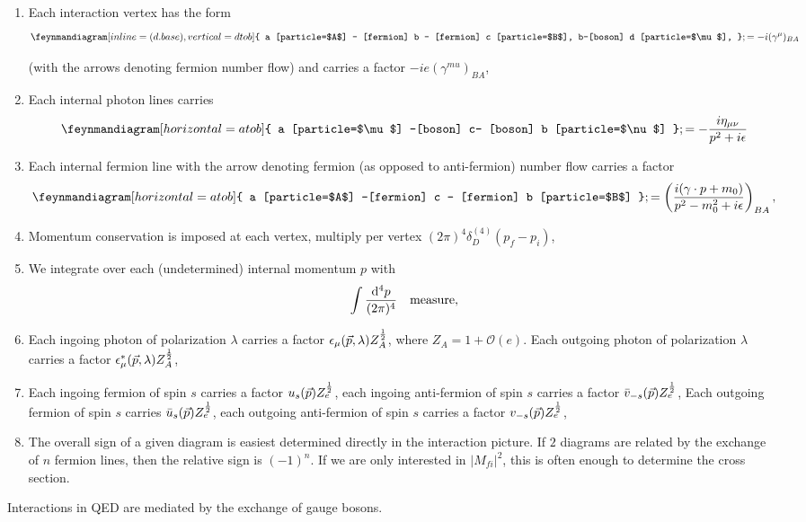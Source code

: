 	\begin{enumerate}
		\item Each interaction vertex has the form 
		\begin{equation}
		\feynmandiagram[inline=(d.base), vertical=d to b] {
		a [particle=$A$] -- [fermion] b -- [fermion] c [particle=$B$],
		b--[boson] d [particle=$\mu$],	
}; = -i (\gamma^{\mu})_{BA}
		\end{equation}

		 (with the arrows denoting fermion number flow) and carries a factor $-i e (\gamma^{mu})_{BA}$,
		 \item Each internal photon lines carries
		 \begin{equation}
		 	\feynmandiagram[ horizontal=a to b]{
		 	a [particle=$\mu$] --[boson] c-- [boson] b [particle=$\nu$]
	 	};
 	= -\frac{i \eta_{\mu \nu} }{p^2 + i \epsilon}
		 \end{equation}
		\item Each internal fermion line with the arrow denoting fermion (as opposed to anti-fermion) number flow carries a factor 
		\begin{equation}
			\feynmandiagram[horizontal=a to b]{
			a [particle=$A$] --[fermion] c -- [fermion] b [particle=$B$]
		};
	= \left(\frac{i(\gamma \cdot p + m_0)}{p^2-m^2_0 +i \epsilon }\right)_{BA},
		\end{equation}
		\item Momentum conservation is imposed at each vertex, multiply per vertex $(2 \pi)^4 \delta^{(4)}_D(p_f-p_i)$,
		\item We integrate over each (undetermined) internal momentum $p$ with
		\begin{equation}
			\int \frac{\mathrm{d}^4 p}{(2 \pi)^4} \quad \mathrm{measure},
		\end{equation}
		\item Each ingoing photon of polarization $\lambda$ carries a factor $\epsilon_{\mu} (\vec{p},\lambda) Z^{\frac{1}{2}}_A$, where $Z_A =1+\mathcal{O}(e)$. Each outgoing photon of polarization $\lambda$ carries a factor $\epsilon^*_{\mu} (\vec{p},\lambda) Z^{\frac{1}{2}}_A$,
		\item Each ingoing fermion of spin $s$ carries a factor $u_s(\vec{p}) Z^{\frac{1}{2}}_e$, each  ingoing anti-fermion of spin $s$ carries a factor $\bar{v}_{-s}(\vec{p})Z^{\frac{1}{2}}_e$, Each outgoing fermion of spin $s$ carries $\bar{u}_s(\vec{p}) Z^{\frac{1}{2}}_e$, each outgoing anti-fermion of spin $s$ carries a factor $v_{-s}(\vec{p})Z^{\frac{1}{2}}_e$,
		\item The overall sign of a given diagram is easiest determined directly in the interaction picture. If $2$ diagrams are related by the exchange of $n$ fermion lines, then the relative sign is $(-1)^n$. If we are only interested in $|M_{fi}|^2$, this is often enough to determine the cross section.
	\end{enumerate}
Interactions in QED are mediated by the exchange of gauge bosons.











